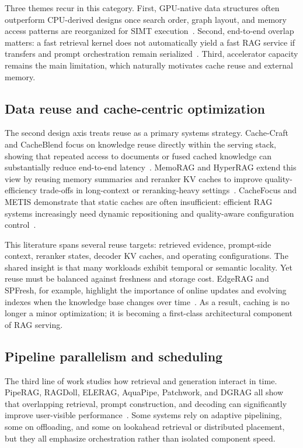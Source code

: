 \documentclass[acmsmall,screen]{acmart}
\begin{document}
Three themes recur in this category. First, GPU-native data structures often outperform CPU-derived designs once search order, graph layout, and memory access patterns are reorganized for SIMT execution~\cite{cagra2024}. Second, end-to-end overlap matters: a fast retrieval kernel does not automatically yield a fast RAG service if transfers and prompt orchestration remain serialized~\cite{rago2025,hermes2025}. Third, accelerator capacity remains the main limitation, which naturally motivates cache reuse and external memory.

\subsection{Data reuse and cache-centric optimization}

The second design axis treats reuse as a primary systems strategy. Cache-Craft and CacheBlend focus on knowledge reuse directly within the serving stack, showing that repeated access to documents or fused cached knowledge can substantially reduce end-to-end latency~\cite{cachecraft2025,cacheblend2025}. MemoRAG and HyperRAG extend this view by reusing memory summaries and reranker KV caches to improve quality-efficiency trade-offs in long-context or reranking-heavy settings~\cite{memorag2025,hyperrag2025}. CacheFocus and METIS demonstrate that static caches are often insufficient: efficient RAG systems increasingly need dynamic repositioning and quality-aware configuration control~\cite{cachefocus2025,metis2025}.

This literature spans several reuse targets: retrieved evidence, prompt-side context, reranker states, decoder KV caches, and operating configurations. The shared insight is that many workloads exhibit temporal or semantic locality. Yet reuse must be balanced against freshness and storage cost. EdgeRAG and SPFresh, for example, highlight the importance of online updates and evolving indexes when the knowledge base changes over time~\cite{edgerag2024,spfresh2023}. As a result, caching is no longer a minor optimization; it is becoming a first-class architectural component of RAG serving.

\subsection{Pipeline parallelism and scheduling}

The third line of work studies how retrieval and generation interact in time. PipeRAG, RAGDoll, ELERAG, AquaPipe, Patchwork, and DGRAG all show that overlapping retrieval, prompt construction, and decoding can significantly improve user-visible performance~\cite{piperag2025,ragdoll2025,elerag2025,aquapipe2025,patchwork2025,dgrag2025}. Some systems rely on adaptive pipelining, some on offloading, and some on lookahead retrieval or distributed placement, but they all emphasize orchestration rather than isolated component speed.
\end{document}
